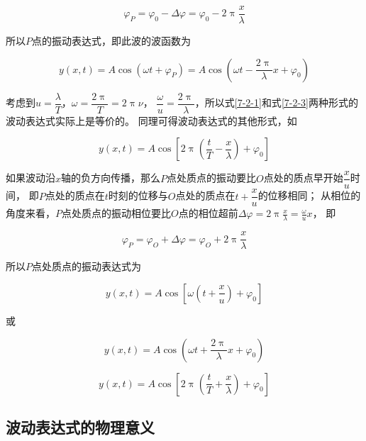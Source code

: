 \documentclass[12pt, a4paper]{article}
\numberwithin{equation}{section}
\begin{document}
    \begin{equation}
        \varphi_P=\varphi_0-\Delta \varphi=\varphi_0-2 \uppi \frac{x}{\lambda}
    \end{equation}

    所以\(P \)点的振动表达式，即此波的波函数为

    \begin{equation}
        y(x, t)=A \cos \left(\omega t+\varphi_P\right)=A \cos \left(\omega t-\frac{2 \uppi}{\lambda} x+\varphi_0\right)
        \label{7-2-3}
    \end{equation}

    考虑到\(u = \dfrac{\lambda }{T }\)，\(\omega = \dfrac{2 \uppi}{T } = 2 \uppi \nu\)，
    \(\dfrac{\omega}{u}=\dfrac{2 \uppi}{\lambda}\)，所以式\ref{7-2-1}和式\ref{7-2-3}两种形式的波动表达式实际上是等价的。
    同理可得波动表达式的其他形式，如

    \begin{equation}
        y(x, t)=A \cos \left[2 \uppi\left(\frac{t}{T}-\frac{x}{\lambda}\right)+\varphi_0\right]
    \end{equation}

    如果波动沿\(x \)轴的负方向传播，那么\(P \)点处质点的振动要比\(O \)点处的质点早开始\(\dfrac{x }{u }\)时间，
    即\(P\)点处的质点在\(t\)时刻的位移与\(O\)点处的质点在\(t + \dfrac{x }{u }\)的位移相同；
    从相位的角度来看，\(P \)点处质点的振动相位要比\(O \)点的相位超前$\Delta \varphi=2 \uppi \frac{x}{\lambda}=\frac{\omega}{u} x$，
    即

    $$
        \varphi_P=\varphi_O+\Delta \varphi=\varphi_O+2 \uppi \frac{x}{\lambda}
    $$

    所以\(P \)点处质点的振动表达式为

    \begin{equation}
        y(x, t)=A \cos \left[\omega\left(t+\frac{x}{u}\right)+\varphi_0\right]
    \end{equation}
    
    或

    \begin{equation}
        y(x, t)=A \cos \left(\omega t+\frac{2 \uppi}{\lambda} x+\varphi_0\right)
    \end{equation}

    \begin{equation}
        y(x, t)=A \cos \left[2 \uppi\left(\frac{t}{T}+\frac{x}{\lambda}\right)+\varphi_0\right]
    \end{equation}

\subsection{波动表达式的物理意义}
\end{document}
